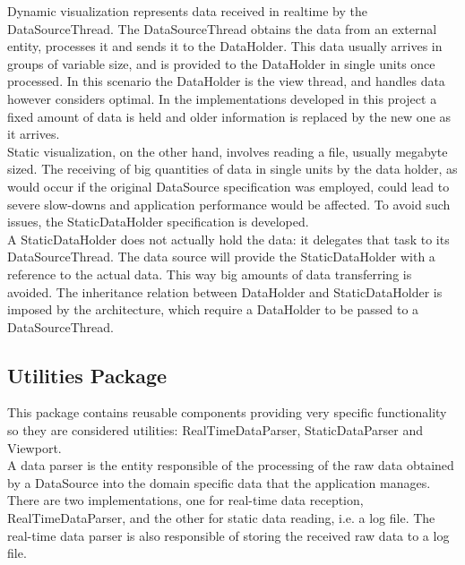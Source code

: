 		Dynamic visualization represents data received in realtime by the DataSourceThread. The DataSourceThread obtains the data from an external entity, processes it and sends it to the DataHolder. This data usually arrives in groups of variable size, and is provided to the DataHolder in single units once processed. In this scenario the DataHolder is the view thread, and handles data however considers optimal. In the implementations developed in this project a fixed amount of data is held and older information is replaced by the new one as it arrives.\\

		Static visualization, on the other hand, involves reading a file, usually megabyte sized. The receiving of big quantities of data in single units by the data holder, as would occur if  the original DataSource specification was employed, could lead to severe slow-downs and application performance would be affected. To avoid such issues, the StaticDataHolder specification is developed.\\

		A StaticDataHolder does not actually hold the data: it delegates that task to its DataSourceThread. The data source will provide the StaticDataHolder with a reference to the actual data. This way big amounts of data transferring is avoided. The inheritance relation between DataHolder and StaticDataHolder is imposed by the architecture, which require a DataHolder to be passed to a DataSourceThread.\\

		\subsection{Utilities Package}

		This package contains reusable components providing very specific functionality so they are considered utilities: RealTimeDataParser, StaticDataParser and Viewport.\\

		A data parser is the entity responsible of the processing of the raw data obtained by a DataSource into the domain specific data that the application manages. There are two implementations, one for real-time data reception, RealTimeDataParser, and the other for static data reading, i.e. a log file. The real-time data parser is also responsible of storing the received raw data to a log file.\\

